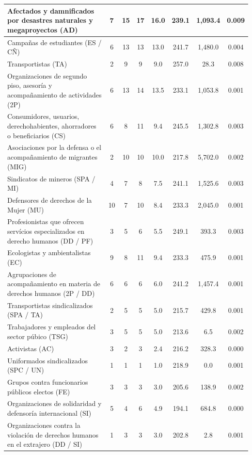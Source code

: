 \documentclass[letterpaper, 11pt]{book}
\theoremstyle{definition}
\theoremstyle{remark}
\begin{document}
{{{{{{{{{{\begin{footnotesize}
\begin{longtable}{|p{7cm}@{ }|@{ }c|@{ }c|@{ }c|@{ }c|@{ }c|@{ }c|@{ }c|}
Afectados y damnificados por desastres naturales y megaproyectos (AD) & 7 & 15 & 17 & 16.0 & 239.1 & 1,093.4 & 0.009\\ \hline
Campañas de estudiantes (ES / CÑ) & 6 & 13 & 13 & 13.0 & 241.7 & 1,480.0 & 0.004\\ \hline
Transportistas (TA) & 2 & 9 & 9 & 9.0 & 257.0 & 28.3 & 0.008\\ \hline
Organizaciones de segundo piso, asesoría y acompañamiento de actividades (2P) & 6 & 13 & 14 & 13.5 & 233.1 & 1,053.8 & 0.001\\ \hline
Consumidores, usuarios, derechohabientes, ahorradores o beneficiarios (CS) & 6 & 8 & 11 & 9.4 & 245.5 & 1,302.8 & 0.003\\ \hline
Asociaciones por la defensa o el acompañamiento de migrantes (MIG) & 2 & 10 & 10 & 10.0 & 217.8 & 5,702.0 & 0.002\\ \hline
Sindicatos de mineros (SPA / MI) & 4 & 7 & 8 & 7.5 & 241.1 & 1,525.6 & 0.003\\ \hline
Defensores de derechos de la Mujer (MU) & 10 & 7 & 10 & 8.4 & 233.3 & 2,045.0 & 0.001\\ \hline
Profesionistas que ofrecen servícios especializados en derecho humanos (DD / PF) & 3 & 5 & 6 & 5.5 & 249.1 & 393.3 & 0.003\\ \hline
Ecologistas y ambientalistas (EC) & 9 & 8 & 11 & 9.4 & 233.3 & 475.9 & 0.001\\ \hline
Agrupaciones de acompañamiento en materia de derechos humanos (2P / DD) & 6 & 6 & 6 & 6.0 & 241.2 & 1,457.4 & 0.001\\ \hline
Transportistas sindicalizados (SPA / TA) & 2 & 5 & 5 & 5.0 & 215.7 & 429.8 & 0.001\\ \hline
Trabajadores y empleados del sector púbico (TSG) & 3 & 5 & 5 & 5.0 & 213.6 & 6.5 & 0.002\\ \hline
Activistas (AC) & 3 & 2 & 3 & 2.4 & 216.2 & 328.3 & 0.000\\ \hline
Uniformados sindicalizados (SPC / UN) & 1 & 1 & 1 & 1.0 & 218.9 & 0.0 & 0.001\\ \hline
Grupos contra funcionarios públicos electos (FE) & 3 & 3 & 3 & 3.0 & 205.6 & 138.9 & 0.002\\ \hline
Organizaciones de solidaridad y defensoría internacional (SI) & 5 & 4 & 6 & 4.9 & 194.1 & 684.8 & 0.000\\ \hline
Organizaciones contra la violación de derechos humanos en el extrajero (DD / SI) & 1 & 3 & 3 & 3.0 & 202.8 & 2.8 & 0.001\\ \hline

\end{longtable}
\end{footnotesize}}}}}}}}}}}
\end{document}
